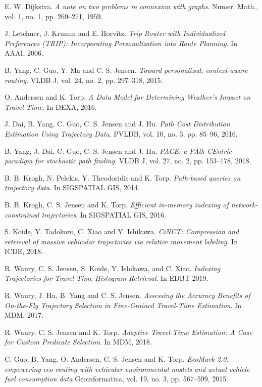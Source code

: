 \documentclass[11pt]{article}
\begin{document}
\begin{thebibliography}{15}

E. W. Dijkstra. \emph{A note on two problems in connexion with graphs}. Numer. Math., vol. 1, no. 1, pp. 269--271, 1959.

J. Letchner, J. Krumm and E. Horvitz. \emph{Trip Router with Individualized Preferences (TRIP): Incorporating Personalization into Route Planning}. In AAAI, 2006.

B. Yang, C. Guo, Y. Ma and C. S. Jensen. \emph{Toward personalized, context-aware routing}. VLDB J, vol. 24, no. 2, pp. 297--318, 2015.

O. Andersen and K. Torp. \emph{A Data Model for Determining Weather's Impact on Travel Time}. In DEXA, 2016.

J. Dai, B. Yang, C. Guo, C. S. Jensen and J. Hu. \emph{Path Cost Distribution Estimation Using Trajectory Data}. PVLDB, vol. 10, no. 3, pp. 85--96, 2016.

B. Yang, J. Dai, C. Guo, C. S. Jensen and J. Hu. \emph{PACE: a PAth-CEntric paradigm for stochastic path finding}. VLDB J, vol. 27, no. 2, pp. 153--178, 2018.

B. B. Krogh, N. Pelekis, Y. Theodoridis and K. Torp. \emph{Path-based queries on trajectory data}. In SIGSPATIAL GIS, 2014.

B. B. Krogh, C. S. Jensen and K. Torp. \emph{Efficient in-memory indexing of network-constrained trajectories}. In SIGSPATIAL GIS, 2016.

S. Koide, Y. Tadokoro, C. Xiao and Y. Ishikawa. \emph{CiNCT: Compression and retrieval of massive vehicular trajectories via relative movement labeling}. In ICDE, 2018.

R. Waury, C. S. Jensen, S. Koide, Y. Ishikawa, and C. Xiao. \emph{Indexing Trajectories for Travel-Time Histogram Retrieval}. In EDBT 2019.

R. Waury, J. Hu, B. Yang and C. S. Jensen. \emph{Assessing the Accuracy Benefits of On-the-Fly Trajectory Selection in Fine-Grained Travel-Time Estimation}. In MDM, 2017.

R. Waury, C. S. Jensen and K. Torp. \emph{Adaptive Travel-Time Estimation: A Case for Custom Predicate Selection}. In MDM, 2018.

C. Guo, B. Yang, O. Andersen, C. S. Jensen and K. Torp. \emph{EcoMark 2.0: empowering eco-routing with vehicular environmental models and actual vehicle fuel consumption data} Geoinformatica, vol. 19, no. 3, pp. 567--599, 2015.


\end{thebibliography}
\end{document}
